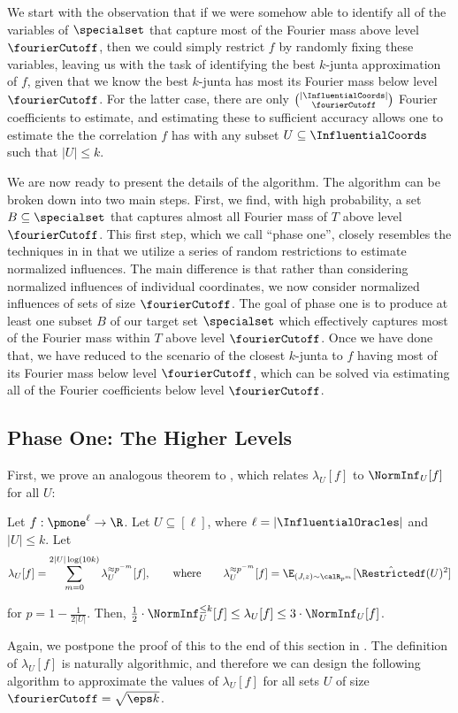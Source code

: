 We start with the observation that if we were somehow able to identify all of the variables of $\specialset$ that capture most of the Fourier mass above level $\fourierCutoff$, then we could simply restrict $f$ by randomly fixing these variables, leaving us with the task of identifying the best $k$-junta approximation of $f$, given that we know the best $k$-junta has most its Fourier mass below level $\fourierCutoff$. For the latter case, there are only $\binom{|\InfluentialCoords|}{\fourierCutoff}$ Fourier coefficients to estimate, and estimating these to sufficient accuracy allows one to estimate the the correlation $f$ has with any subset $U\subseteq \InfluentialCoords$ such that $|U| \leq k$. 


We are now ready to present the details of the algorithm. The algorithm can be  broken down into two main steps. First, we find, with high probability, a set $B \subseteq \specialset$ that captures almost all Fourier mass of $T$ above level $\fourierCutoff$. This first step, which we call ``phase one'', closely resembles the techniques in  in that we utilize a series of random restrictions to estimate normalized influences. The main difference is that rather than considering normalized influences of individual coordinates, we now consider normalized influences of sets of size $\fourierCutoff$. The goal of phase one is to produce at least one subset $B$ of our target set $\specialset$ which effectively captures most of the Fourier mass within $T$ above level $\fourierCutoff$. Once we have done that, we have reduced to the scenario of the closest $k$-junta to $f$ having most of its Fourier mass below level $\fourierCutoff$, which can be solved via estimating all of the Fourier coefficients below level $\fourierCutoff$. 

\subsection{Phase One: The Higher Levels}

First, we prove an analogous theorem to , which relates $\lambda_U[f]$ to $\NormInf_U[f]$ for all $U$:
\begin{theorem}
\label{theorem:ninf-ub-lb-set}
Let $f: \pmone^\ell \to \R$.
Let $U \subseteq [\ell]$, where $\ell = |\InfluentialOracles|$ and $|U| \leq k$.
Let 
$$\lambda_U[f] = \sum_{m=0}^{2|U|\log(10k)} \lambda_U^{\approx p^{-m}}[f],\qquad \text{where}\qquad 
\lambda_U^{\approx p^{-m}}[f] = \E_{(J,z) \sim \calR_{p^{m}}}[\hat{\Restrictedf}(U)^2]$$
%

for $p = 1-\frac{1}{2|U|}$.
Then, $\frac{1}{2}\cdot \NormInf_U^{\leq k}[f] \le \lambda_U[f] \le 3\cdot \NormInf_U[f]$.
\end{theorem}
Again, we postpone the proof of this to the end of this section in .
The definition of $\lambda_U[f]$ is naturally algorithmic, and therefore we can design the following algorithm to approximate the values of $\lambda_U[f]$ for all sets $U$ of size $\fourierCutoff = \sqrt{\eps k}$. 




